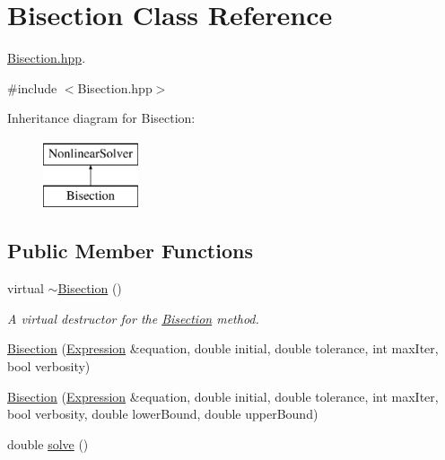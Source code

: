 \hypertarget{class_bisection}{}\section{Bisection Class Reference}
\label{class_bisection}


\hyperlink{_bisection_8hpp_source}{Bisection.\+hpp}.  




{\ttfamily \#include $<$Bisection.\+hpp$>$}

Inheritance diagram for Bisection\+:\begin{figure}[H]
\begin{center}
\leavevmode
\includegraphics[height=2.000000cm]{class_bisection}
\end{center}
\end{figure}
\subsection*{Public Member Functions}
\begin{DoxyCompactItemize}
\item 
virtual \hyperlink{class_bisection_a44d6c2c0a557a6540980c23ef7eaa6a4}{$\sim$\+Bisection} ()\hypertarget{class_bisection_a44d6c2c0a557a6540980c23ef7eaa6a4}{}\label{class_bisection_a44d6c2c0a557a6540980c23ef7eaa6a4}

\begin{DoxyCompactList}\small\item\em A virtual destructor for the \hyperlink{class_bisection}{Bisection} method. \end{DoxyCompactList}\item 
\hyperlink{class_bisection_afef6fa8f828ffa4f46e26189425421bf}{Bisection} (\hyperlink{class_expression}{Expression} \&equation, double initial, double tolerance, int max\+Iter, bool verbosity)
\item 
\hyperlink{class_bisection_a38ccdd59524e49ec73ee437f9daa5033}{Bisection} (\hyperlink{class_expression}{Expression} \&equation, double initial, double tolerance, int max\+Iter, bool verbosity, double lower\+Bound, double upper\+Bound)
\item 
double \hyperlink{class_bisection_a14e36ab0143cf54dc71f2c9da238fe15}{solve} ()
\end{DoxyCompactItemize}
